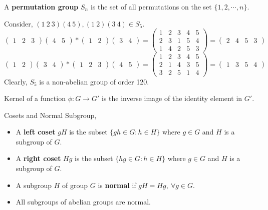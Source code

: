 \begin{definition}
	A \textbf{permutation group} $S_n$ is the set of all permutations on the set $\{1,2,\cdots,n\}$.	
\end{definition}

\begin{remark}
	Consider, $(1\ 2\ 3)(4\ 5), (1\ 2)(3\ 4) \in S_5$.
	$$\begin{pmatrix} 1 & 2 & 3 \end{pmatrix} \begin{pmatrix} 4 & 5 \end{pmatrix} \ast \begin{pmatrix} 1 & 2 \end{pmatrix} \begin{pmatrix} 3 & 4 \end{pmatrix} =  \begin{pmatrix} 1 & 2 & 3 & 4 & 5 \\ 2 & 3 & 1 & 5 & 4 \\ 1 & 4 & 2 & 5 & 3 \end{pmatrix}  = \begin{pmatrix} 2 & 4 & 5 & 3 \end{pmatrix} $$
	$$\begin{pmatrix} 1 & 2 \end{pmatrix} \begin{pmatrix} 3 & 4 \end{pmatrix} \ast \begin{pmatrix} 1 & 2 & 3\end{pmatrix} \begin{pmatrix} 4 & 5 \end{pmatrix} =  \begin{pmatrix} 1 & 2 & 3 & 4 & 5 \\ 2 & 1 & 4 & 3 & 5 \\ 3 & 2 & 5 & 1 & 4 \end{pmatrix}  = \begin{pmatrix} 1 & 3 & 5 & 4 \end{pmatrix} $$
	Clearly, $S_5$ is a non-abelian group of order 120.
\end{remark}

\begin{definition}
	Kernel of a function $\phi : G \to G'$ is the inverse image of the identity element in $G'$. %
\end{definition}

\begin{definition}Cosets and Normal Subgroup,
	\begin{itemize}
		\item A \textbf{left coset} $gH$ is the subset $\{ gh \in G : h \in H \}$ where $g \in G$ and  $H$ is a subgroup of $G$.%
		\item A \textbf{right coset} $Hg$ is the subset $\{ hg \in G : h \in H \}$ where $g \in G$ and  $H$ is a subgroup of $G$.%
		\item A subgroup $H$ of group $G$ is \textbf{normal} if $gH = Hg,\ \forall g \in G$.
		\item All subgroups of abelian groups are normal.
	\end{itemize}
\end{definition}

